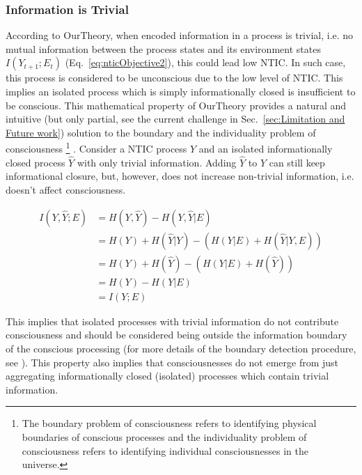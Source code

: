 \documentclass[utf8]{article}
\begin{document}
            \subsubsection*{Information is Trivial}
                According to \ac{OurTheory}, when encoded information in a process is trivial, i.e. no mutual information between the process states and its environment states $I(Y_{t+1};E_{t})$ (Eq.~\ref{eq:nticObjective2}), this could lead low NTIC. In such case, this process is considered to be unconscious due to the low level of NTIC. This implies an isolated process which is simply informationally closed is insufficient to be conscious. 
                This mathematical property of \ac{OurTheory} provides a natural and intuitive (but only partial, see the current challenge in  Sec.~\ref{sec:Limitation and Future work}) solution to the boundary and the individuality problem of consciousness
                    \footnote{The boundary problem of consciousness refers to identifying physical boundaries of conscious processes and the individuality problem of consciousness refers to identifying individual consciousnesses in the universe.}
                \citep{Raymont2006-RAYUOC}. Consider a NTIC process $Y$ and an isolated informationally closed process $\hat{Y}$ with only trivial information. Adding $\hat{Y}$ to $Y$ can still keep informational closure, but, however, does not increase non-trivial information, i.e. doesn't affect consciousness. 
                
    			\begin{equation}
    			    \begin{aligned}
                        I(Y,\hat{Y};E) & = H(Y,\hat{Y}) - H(Y,\hat{Y}|E) \\
                                       & = H(Y) + H(\hat{Y}|Y) - (H(Y|E)+H(\hat{Y}|Y,E)) \\
                                       & = H(Y) + H(\hat{Y}) - (H(Y|E)+H(\hat{Y})) \\
                                       & = H(Y) - H(Y|E)\\
                                       & = I(Y;E)				
    				\end{aligned}
    			\end{equation}
                
                This implies that isolated processes with trivial information do not contribute consciousness and should be considered being outside the information boundary of the conscious processing (for more details of the boundary detection procedure, see \cite{krakauer2014information}). 
                This property also implies that consciousnesses do not emerge from just aggregating informationally closed (isolated) processes which contain trivial information.%
                
\end{document}
